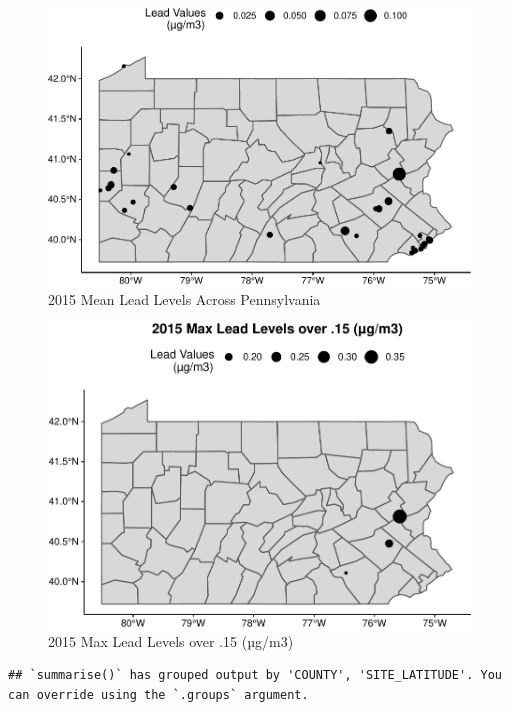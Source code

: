 \documentclass[
  12pt,
]{article}
\begin{document}
\begin{figure}
\centering
\includegraphics{Alcorn_Bao_Hermanson_ENV872_Project_files/figure-latex/spatial analysis 2015.5-1.pdf}
\caption{2015 Mean Lead Levels Across Pennsylvania}
\end{figure}

\begin{figure}
\centering
\includegraphics{Alcorn_Bao_Hermanson_ENV872_Project_files/figure-latex/spatial analysis 2015.6-1.pdf}
\caption{2015 Max Lead Levels over .15 (µg/m3)}
\end{figure}

\begin{verbatim}
## `summarise()` has grouped output by 'COUNTY', 'SITE_LATITUDE'. You can override using the `.groups` argument.
\end{verbatim}
\end{document}
